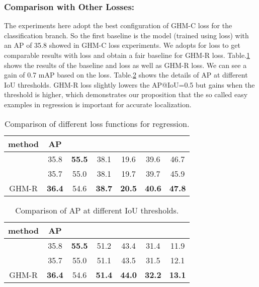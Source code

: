 \documentclass[letterpaper]{article} \usepackage{aaai19}  \usepackage{times}  \usepackage{helvet}  \usepackage{courier}  \usepackage{url}  \usepackage{graphicx}  \usepackage{amsmath,amssymb}
\begin{document}
\subsubsection{Comparison with Other Losses:} The experiments here adopt the best configuration of GHM-C loss for the classification branch. So the first baseline is the model (trained using  loss) with an AP of 35.8 showed in GHM-C loss experiments. We adopts  for  loss to get comparable results with  loss and obtain a fair baseline for GHM-R loss. Table.\ref{tab:reg1} shows the results of the baseline  and  loss as well as  GHM-R loss. We can see a gain of 0.7 mAP based on the  loss. Table.\ref{tab:regthr} shows the details of AP at different IoU thresholds.  GHM-R loss slightly lowers the AP@IoU=0.5 but gains when the threshold is higher, which demonstrates our proposition that the so called easy examples in regression is important for accurate localization.
\begin{table}[!ht]
\begin{center}
\begin{tabular}{| c | c  c  c  c  c  c |}
\hline
method & AP &  &  &  &  &  \\
\hline
 & 35.8 & \textbf{55.5} & 38.1 & 19.6 & 39.6 & 46.7 \\
 & 35.7 & 55.0 & 38.1 & 19.7 & 39.7 & 45.9 \\
GHM-R & \textbf{36.4} & 54.6 & \textbf{38.7} & \textbf{20.5} & \textbf{40.6} & \textbf{47.8} \\
\hline 
\end{tabular}
\caption{Comparison of different loss functions for regression.}
\label{tab:reg1}
\end{center}
\end{table}

\begin{table}[!ht]
\begin{center}
\begin{tabular}{| c | c  c  c  c  c  c |}
\hline
method & AP &  &  &  &  &  \\
\hline
 & 35.8 & \textbf{55.5} & 51.2 & 43.4 & 31.4 & 11.9 \\
 & 35.7 & 55.0 & 51.1 & 43.5 & 31.5 & 12.1 \\
GHM-R & \textbf{36.4} & 54.6 & \textbf{51.4} & \textbf{44.0} & \textbf{32.2} & \textbf{13.1} \\
\hline
\end{tabular}
\caption{Comparison of AP at different IoU thresholds.}
\label{tab:regthr}
\end{center}
\end{table}
\end{document}
